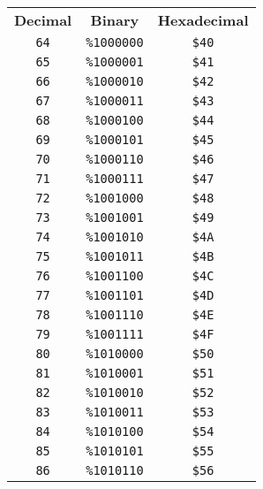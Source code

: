 \begin{multicols}{2}
  \begin{center}
  \begin{tabular}{|c|c|c|}
  \hline
		\textbf{Decimal} & \textbf{Binary} & \textbf{Hexadecimal} \\ \hhline{|=|=|=|}   
  \texttt{64} & \texttt{\%1000000} &  \texttt{\$40} \\ \hline
 \texttt{65} & \texttt{\%1000001} &  \texttt{\$41} \\ \hline
 \texttt{66} & \texttt{\%1000010} &  \texttt{\$42} \\ \hline
 \texttt{67} & \texttt{\%1000011} &  \texttt{\$43} \\ \hline
 \texttt{68} & \texttt{\%1000100} &  \texttt{\$44} \\ \hline
 \texttt{69} & \texttt{\%1000101} &  \texttt{\$45} \\ \hline
 \texttt{70} & \texttt{\%1000110} &  \texttt{\$46} \\ \hline
 \texttt{71} & \texttt{\%1000111} &  \texttt{\$47} \\ \hline
 \texttt{72} & \texttt{\%1001000} &  \texttt{\$48} \\ \hline
 \texttt{73} & \texttt{\%1001001} &  \texttt{\$49} \\ \hline
 \texttt{74} & \texttt{\%1001010} &  \texttt{\$4A} \\ \hline
 \texttt{75} & \texttt{\%1001011} &  \texttt{\$4B} \\ \hline
 \texttt{76} & \texttt{\%1001100} &  \texttt{\$4C} \\ \hline
 \texttt{77} & \texttt{\%1001101} &  \texttt{\$4D} \\ \hline
 \texttt{78} & \texttt{\%1001110} &  \texttt{\$4E} \\ \hline
 \texttt{79} & \texttt{\%1001111} &  \texttt{\$4F} \\ \hline
 \texttt{80} & \texttt{\%1010000} &  \texttt{\$50} \\ \hline
 \texttt{81} & \texttt{\%1010001} &  \texttt{\$51} \\ \hline
 \texttt{82} & \texttt{\%1010010} &  \texttt{\$52} \\ \hline
 \texttt{83} & \texttt{\%1010011} &  \texttt{\$53} \\ \hline
 \texttt{84} & \texttt{\%1010100} &  \texttt{\$54} \\ \hline
 \texttt{85} & \texttt{\%1010101} &  \texttt{\$55} \\ \hline
 \texttt{86} & \texttt{\%1010110} &  \texttt{\$56} \\ \hline

\end{tabular}
\end{center}
\end{multicols}
